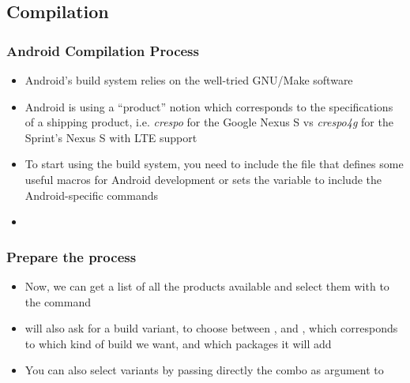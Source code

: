\subsection{Compilation}
\begin{frame}
  \frametitle{Android Compilation Process}
  \begin{itemize}
  \item Android's build system relies on the well-tried GNU/Make
    software
  \item Android is using a ``product'' notion which corresponds to the
    specifications of a shipping product, i.e. \textit{crespo} for the
    Google Nexus S vs \textit{crespo4g} for the Sprint's Nexus S with
    LTE support
  \item To start using the build system, you need to include the file
     that defines some useful macros for
    Android development or sets the  variable to include the
    Android-specific commands
  \item {}
  \end{itemize}
\end{frame}

\begin{frame}
  \frametitle{Prepare the process}
  \begin{itemize}
  \item Now, we can get a list of all the products available and
    select them with to the  command
  \item {} will also ask for a build variant, to choose
    between ,  and , which
    corresponds to which kind of build we want, and which packages it
    will add
  \item You can also select variants by passing directly the combo
     as argument to 
  \end{itemize}
\end{frame}


